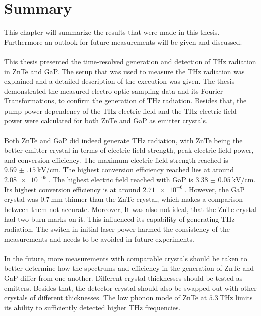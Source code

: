\chapter{Summary}
This chapter will summarize the results that were made in this thesis.
Furthermore an outlook for future measurements will be given and discussed.
\\\\
This thesis presented the time-resolved generation and detection of $\si{\tera\hertz}$ radiation in ZnTe and GaP.
The setup that was used to measure the $\si{\tera\hertz}$ radiation was explained and a detailed description of the execution was given.
The thesis demonstrated the measured electro-optic sampling data and its Fourier-Transformations, to confirm the generation of $\si{\tera\hertz}$ radiation.
Besides that, the pump power dependency of the $\si{\tera\hertz}$ electric field and the $\si{\tera\hertz}$ electric field power were calculated for both ZnTe and GaP as emitter crystals.
\\\\
Both ZnTe and GaP did indeed generate $\si{\tera\hertz}$ radiation, with ZnTe being the better emitter crystal in terms of electric field strength, peak electric field power, and conversion efficiency.
The maximum electric field strength reached is $\SI{9.59(15)}{\kilo\V\per\centi\meter}$.
The highest conversion efficiency reached lies at around $\SI{2.08e-05}{}$.
The highest electric field reached with GaP is $\SI{3.38(5)}{\kilo\V\per\centi\meter}$.
Its highest conversion efficiency is at around $\SI{2.71e-6}{}$.
However, the GaP crystal was $\SI{0.7}{\milli\meter}$ thinner than the ZnTe crystal, which makes a comparison between them not accurate.
Moreover, It was also not ideal, that the ZnTe crystal had two burn marks on it.
This influenced its capability of generating $\si{\tera\hertz}$ radiation.
The switch in initial laser power harmed the consistency of the measurements and needs to be avoided in future experiments.
\\\\
In the future, more measurements with comparable crystals should be taken to better determine how the spectrums and efficiency in the generation of ZnTe and GaP differ from one another.
Different crystal thicknesses should be tested as emitters.
Besides that, the detector crystal should also be swapped out with other crystals of different thicknesses.
The low phonon mode of ZnTe at $\SI{5.3}{\tera\hertz}$ limits its ability to sufficiently detected higher $\si{\tera\hertz}$ frequencies.
